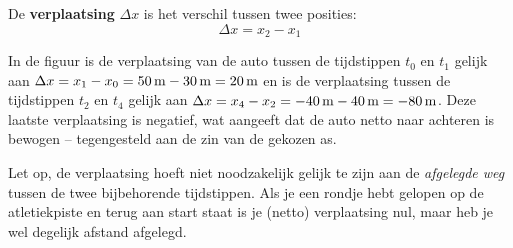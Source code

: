 \documentclass{ximera}
\begin{document}
	\begin{definition}
	De \textbf{verplaatsing} \(\Delta x\) is het verschil tussen twee posities:
	\[
		\Delta x = x_2-x_1
	\]
	\end{definition}

	In de figuur is de verplaatsing van de auto tussen de tijdstippen $t_0$ en $t_1$ gelijk aan $\Delta x = x_1-x_0=50\rm\,m-30\rm\,m=20\rm\,m$ en is de verplaatsing tussen de tijdstippen $t_2$ en $t_4$ gelijk aan $\Delta x=x_4-x_2=-40\rm\,m-40\rm\,m=-80\rm\,m$. Deze laatste verplaatsing is negatief, wat aangeeft dat de auto netto naar achteren is bewogen -- tegengesteld aan de zin van de gekozen as.

Let op, de verplaatsing hoeft niet noodzakelijk gelijk te zijn aan de \emph{afgelegde weg} tussen de twee bijbehorende tijdstippen. Als je een rondje hebt gelopen op de atletiekpiste en terug aan start staat is je (netto) verplaatsing nul, maar heb je wel degelijk afstand afgelegd.

	
\end{document}
